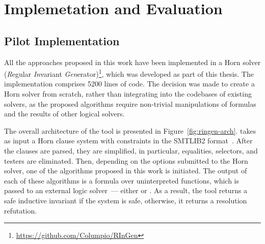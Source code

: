 \chapter{Implemetation and Evaluation}\label{ch:evaluation}

\section{Pilot Implementation}
All the approaches proposed in this work have been implemented in a Horn solver \theringen{} (\emph{R}egular \emph{In}variant \emph{Gen}erator)\footnote{\url{https://github.com/Columpio/RInGen}}, which was developed as part of this thesis. The implementation comprises 5200 lines of \fsharp{} code. The decision was made to create a Horn solver from scratch, rather than integrating into the codebases of existing solvers, as the proposed algorithms require non-trivial manipulations of formulas and the results of other logical solvers.


The overall architecture of the tool is presented in Figure~\ref{fig:ringen-arch}.
\theringen{} takes as input a Horn clause system with constraints in the SMTLIB2 format~\cite{BarFT-RR-17}.
After the clauses are parsed, they are simplified, in particular, equalities, selectors, and testers are eliminated. Then, depending on the options submitted to the Horn solver, one of the algorithms proposed in this work is initiated. The output of each of these algorithms is a formula over uninterpreted functions, which is passed to an external logic solver~--- either \vampire{} or \cvc{}.
As a result, the tool returns a safe inductive invariant if the system is safe, otherwise, it returns a resolution refutation.

